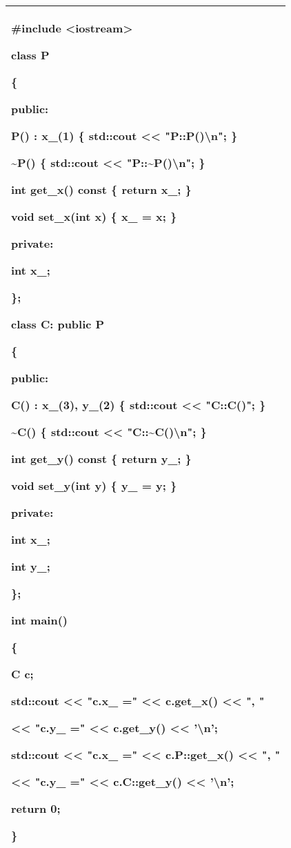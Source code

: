 \documentclass[
]{article}
\begin{document}
\begin{longtable}[]{@{}l@{}}
\toprule
\endhead
\begin{minipage}[t]{0.97\columnwidth}\raggedright
\#include \textless iostream\textgreater{}

class P

\{

public:

P() : x\_(1) \{ std::cout \textless\textless{} "P::P()\textbackslash n";
\}

\textbf{\textasciitilde{}P() \{ std::cout \textless\textless{}
"P::\textasciitilde P()\textbackslash n"; \}}

int get\_x() const \{ return x\_; \}

void set\_x(int x) \{ x\_ = x; \}

private:

int x\_;

\};

class C: public P

\{

public:

C() : x\_(3), y\_(2) \{ std::cout \textless\textless{} "C::C()"; \}

\textbf{\textasciitilde{}C() \{ std::cout \textless\textless{}
"C::\textasciitilde C()\textbackslash n"; \}}

int get\_y() const \{ return y\_; \}

void set\_y(int y) \{ y\_ = y; \}

private:

int x\_;

int y\_;

\};

int main()

\{

C c;

std::cout \textless\textless{} "c.x\_ =" \textless\textless{} c.get\_x()
\textless\textless{} ", "

\textless\textless{} "c.y\_ =" \textless\textless{} c.get\_y()
\textless\textless{} '\textbackslash n';

std::cout \textless\textless{} "c.x\_ =" \textless\textless{}
c.P::get\_x() \textless\textless{} ", "

\textless\textless{} "c.y\_ =" \textless\textless{} c.C::get\_y()
\textless\textless{} '\textbackslash n';

return 0;

\}\strut
\end{minipage}\tabularnewline
\bottomrule
\end{longtable}
\end{document}
